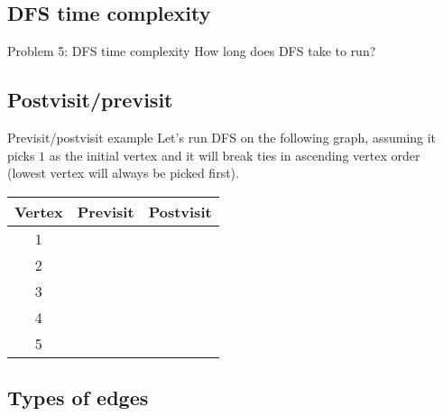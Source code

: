 \documentclass{article}
\begin{document}
\subsection{DFS time complexity}

\begin{problem}{Problem 5: DFS time complexity}
    How long does DFS take to run?
\end{problem}


\newpage
\subsection{Postvisit/previsit}
\vspace{3.5cm}

\begin{example}{Previsit/postvisit example}
    Let's run DFS on the following graph, assuming it picks $1$ as the initial vertex and it will break ties in ascending vertex order (lowest vertex will always be picked first).

    \vspace{2mm}
    \begin{minipage}{0.5\linewidth}
    \centering
    \end{minipage}
    \begin{minipage}{0.5\linewidth}
    \centering
    \begin{tabular}{|c|c|c|}
        \hline
        Vertex & Previsit & Postvisit  \\
        \hline
        1 &  &  \\
        2 &  &  \\
        3 &  &  \\
        4 &  &  \\
        5 &  &   \\
        \hline
    \end{tabular}
    \end{minipage}
\end{example}


\subsection{Types of edges}
\end{document}
